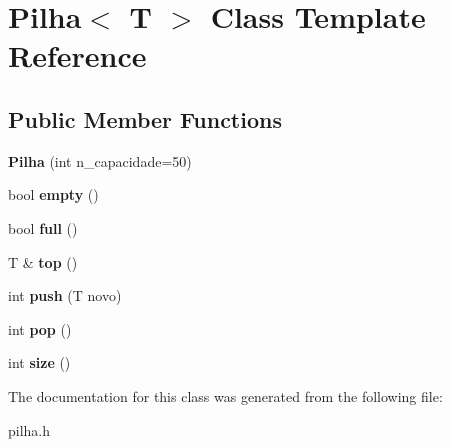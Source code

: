 \hypertarget{class_pilha}{}\section{Pilha$<$ T $>$ Class Template Reference}
\label{class_pilha}
\subsection*{Public Member Functions}
\begin{DoxyCompactItemize}
\item 
\mbox{\label{class_pilha_a3113638095289f155d7c76db4b2da3df}} 
{\bfseries Pilha} (int n\+\_\+capacidade=50)
\item 
\mbox{\label{class_pilha_a117c819eb1bff51136b7c72b486df0fc}} 
bool {\bfseries empty} ()
\item 
\mbox{\label{class_pilha_ae9204010a17accede9ebd6e92c084c15}} 
bool {\bfseries full} ()
\item 
\mbox{\label{class_pilha_adb80016e40c990aa1074f879b1ef7b89}} 
T \& {\bfseries top} ()
\item 
\mbox{\label{class_pilha_a3f80cb860cfa58f459d7f484c9045879}} 
int {\bfseries push} (T novo)
\item 
\mbox{\label{class_pilha_a720f99ec51a9d2e3ae2e59ab78365b84}} 
int {\bfseries pop} ()
\item 
\mbox{\label{class_pilha_aae0f3f465788cefc53f9cadadc0e1fe0}} 
int {\bfseries size} ()
\end{DoxyCompactItemize}


The documentation for this class was generated from the following file\+:\begin{DoxyCompactItemize}
\item 
pilha.\+h\end{DoxyCompactItemize}
